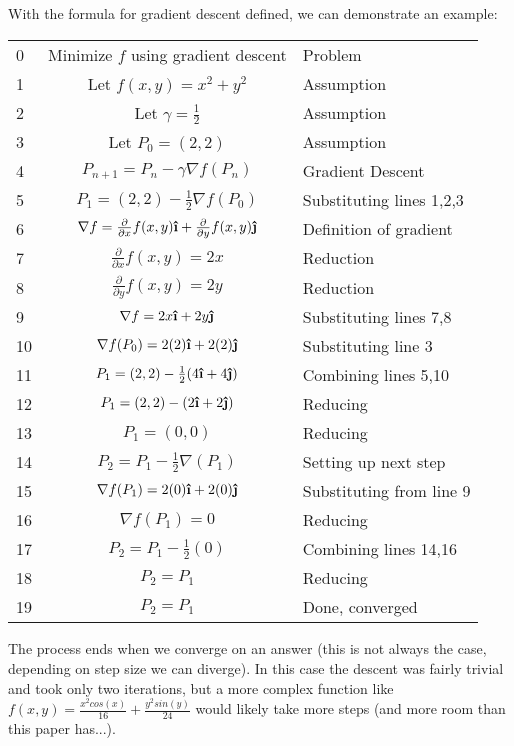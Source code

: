 \documentclass[11pt, a4paper]{article}
\begin{document}
With the formula for gradient descent defined, we can demonstrate an example:
\begin{center}
    \begin{tabular}{l | c | l}
        0 & Minimize $f$ using gradient descent & Problem\\
        1 & Let $f(x,y)=x^2+y^2$ & Assumption\\
        2 & Let $\gamma = \frac{1}{2}$ & Assumption\\
        3 & Let $P_0 = (2,2)$ & Assumption\\
        4 & $P_{n+1} = P_n - \gamma \nabla f(P_n)$ & Gradient Descent \\
        5 & $P_{1} = (2,2) - \frac{1}{2} \nabla f(P_0)$ & Substituting lines 1,2,3 \\
        6 & $\nabla f = \frac{\partial}{\partial x}f(x,y)\boldsymbol{\hat{\textbf{\i}}} + \frac{\partial}{\partial y}f(x,y)\boldsymbol{\hat{\textbf{\j}}}$ & Definition of gradient \\
        7 & $\frac{\partial}{\partial x}f(x,y) = 2x$ & Reduction \\
        8 & $\frac{\partial}{\partial y}f(x,y) = 2y$ & Reduction \\
        9 & $\nabla f = 2x\boldsymbol{\hat{\textbf{\i}}} + 2y \boldsymbol{\hat{\textbf{\j}}}$ & Substituting lines 7,8 \\
        10 & $\nabla f(P_0) = 2(2)\boldsymbol{\hat{\textbf{\i}}} + 2(2) \boldsymbol{\hat{\textbf{\j}}}$ & Substituting line 3 \\
        11 & $P_{1} = (2,2) - \frac{1}{2} (4\boldsymbol{\hat{\textbf{\i}}} + 4 \boldsymbol{\hat{\textbf{\j}}})$ & Combining lines 5,10 \\
        12 & $P_{1} = (2,2) - (2\boldsymbol{\hat{\textbf{\i}}} + 2 \boldsymbol{\hat{\textbf{\j}}})$ & Reducing \\
        13 & $P_{1} = (0,0)$ & Reducing \\
        14 & $P_{2} = P_1 - \frac{1}{2} \nabla(P_1)$ & Setting up next step \\
        15 & $\nabla f(P_1) = 2(0)\boldsymbol{\hat{\textbf{\i}}} + 2(0) \boldsymbol{\hat{\textbf{\j}}}$ & Substituting from line 9 \\
        16 & $\nabla f(P_1) = 0$ & Reducing \\
        17 & $P_{2} = P_1 - \frac{1}{2} (0)$ & Combining lines 14,16\\
        18 & $P_{2} = P_1$ & Reducing\\
        19 & $P_{2} = P_1$ & Done, converged\\
    \end{tabular}
\end{center}
The process ends when we converge on an answer (this is not always the case, depending on step size we can diverge). In this case the descent
was fairly trivial and took only two iterations, but a more complex function like $f(x,y)=\frac{x^2cos(x)}{16} + \frac{y^2sin(y)}{24}$ would 
likely take more steps (and more room than this paper has...).
\end{document}

